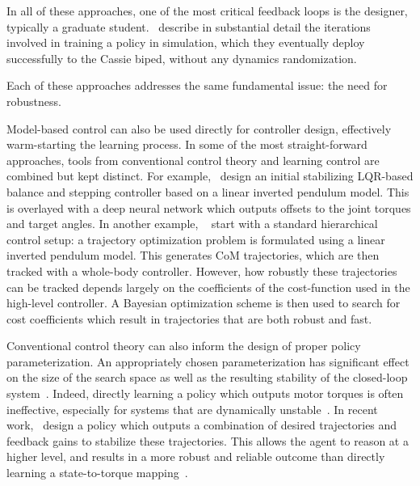 In all of these approaches, one of the most critical feedback loops is the designer, typically a graduate student.~\textcite{xie2019cassie} describe in substantial detail the iterations involved in training a policy in simulation, which they eventually deploy successfully to the Cassie biped, without any dynamics randomization. \par
Each of these approaches addresses the same fundamental issue: the need for robustness. \par
Model-based control can also be used directly for controller design, effectively warm-starting the learning process. In some of the most straight-forward approaches, tools from conventional control theory and learning control are combined but kept distinct. For example,~\textcite{kumar2018improving} design an initial stabilizing LQR-based balance and stepping controller based on a linear inverted pendulum model. This is overlayed with a deep neural network which outputs offsets to the joint torques and target angles.
In another example, ~\textcite{yeganegi2019robust} start with a standard hierarchical control setup: a trajectory optimization problem is formulated using a linear inverted pendulum model. This generates CoM trajectories, which are then tracked with a whole-body controller. However, how robustly these trajectories can be tracked depends largely on the coefficients of the cost-function used in the high-level controller. A Bayesian optimization scheme is then used to search for cost coefficients which result in trajectories that are both robust and fast. \par
Conventional control theory can also inform the design of proper policy parameterization. An appropriately chosen parameterization has significant effect on the size of the search space as well as the resulting stability of the closed-loop system~\cite{roberts2011feedback}. Indeed, directly learning a policy which outputs motor torques is often ineffective, especially for systems that are dynamically unstable~\cite{peng2017learning}. In recent work,~\textcite{viereck2018learning} design a policy which outputs a combination of desired trajectories and feedback gains to stabilize these trajectories. This allows the agent to reason at a higher level, and results in a more robust and reliable outcome than directly learning a state-to-torque mapping~\cite{viereck2018learning}.
